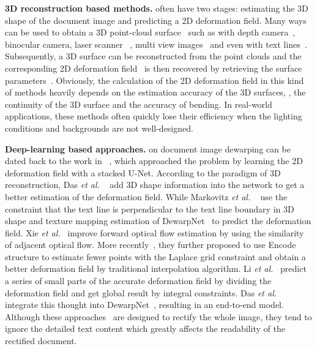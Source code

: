 \documentclass[10pt,twocolumn,letterpaper]{article}
\newcommand{\myparagraph}[1]{\vspace{1pt} \noindent \textbf{#1} }
\begin{document}
\myparagraph{3D reconstruction based methods.} often have two stages: estimating the 3D shape of the document image and predicting a 2D deformation field. Many ways can be used to obtain a 3D point-cloud surface~\cite{you2017multiview} such as with depth camera~\cite{ulges2004document,zhang2008improved}, binocular camera, laser scanner ~\cite{zhang2008improved}, multi view images~\cite{you2017multiview} and even with text lines~\cite{tian2011rectification}. Subsequently, a 3D surface can be reconstructed from the point clouds and the corresponding 2D deformation field~\cite {brown2007restoring} is then recovered by retrieving the surface parameters~\cite{meng2011metric,meng2018exploiting}. 
Obviously, the calculation of the 2D deformation field in this kind of methods heavily depends on the estimation accuracy of the 3D surfaces, \eg, the continuity of the 3D surface and the accuracy of bending. In real-world applications, these methods often quickly lose their efficiency when the lighting conditions and backgrounds are not well-designed.

\myparagraph{Deep-learning based approaches.} on document image dewarping can be dated back to the work in ~\cite{Ma_2018_CVPR}, which approached the problem by learning the 2D deformation field with a stacked U-Net. According to the paradigm of 3D reconstruction, Das {\em et al.} ~\cite{Das_2019_ICCV} add 3D shape information into the network to get a better estimation of the deformation field. While Markovitz {\em et al.} ~\cite{CEARSE} use the constraint that the text line is perpendicular to the text line boundary in 3D shape and texture mapping estimation of DewarpNet~\cite{Das_2019_ICCV} to predict the deformation field. Xie {\em et al.}~\cite{xie2020dewarping} improve forward optical flow estimation by using the similarity of adjacent optical flow. More recently~\cite{xie2021document}, they further proposed to use Encode structure to estimate fewer points with the Laplace grid constraint and obtain a better deformation field by traditional interpolation algorithm. Li {\em et al.}~\cite{li2019document} predict a series of small parts of the accurate deformation field by dividing the deformation field and get global result by integral constraints. Das {\em et al.} ~\cite{das2021end} integrate this thought into DewarpNet~\cite{Das_2019_ICCV}, resulting in an end-to-end model.  
Although these approaches~\cite{ramanna2019document,liu2020geometric,feng2021doctr} are designed to rectify the whole image, they tend to ignore the detailed text content which greatly affects the readability of the rectified document.
\vspace{-1em}
\end{document}
